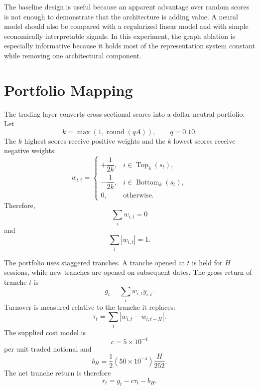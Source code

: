 \documentclass[10pt]{article}
\begin{document}
The baseline design is useful because an apparent advantage over random scores is not enough to demonstrate that the architecture is adding value. A neural model should also be compared with a regularized linear model and with simple economically interpretable signals. In this experiment, the graph ablation is especially informative because it holds most of the representation system constant while removing one architectural component.

\section{Portfolio Mapping}

The trading layer converts cross-sectional scores into a dollar-neutral portfolio. Let
\begin{equation}
k=\max(1,\operatorname{round}(qA)),
\qquad q=0.10.
\end{equation}
The $k$ highest scores receive positive weights and the $k$ lowest scores receive negative weights:
\begin{equation}
w_{i,t}
=
\begin{cases}
+\dfrac{1}{2k}, & i\in\operatorname{Top}_k(s_t),\\[5pt]
-\dfrac{1}{2k}, & i\in\operatorname{Bottom}_k(s_t),\\[5pt]
0, & \text{otherwise}.
\end{cases}
\end{equation}
Therefore,
\begin{equation}
\sum_iw_{i,t}=0
\end{equation}
and
\begin{equation}
\sum_i|w_{i,t}|=1.
\end{equation}

The portfolio uses staggered tranches. A tranche opened at $t$ is held for $H$ sessions, while new tranches are opened on subsequent dates. The gross return of tranche $t$ is
\begin{equation}
g_t=\sum_iw_{i,t}y_{i,t}.
\end{equation}
Turnover is measured relative to the tranche it replaces:
\begin{equation}
\tau_t=\sum_i|w_{i,t}-w_{i,t-H}|.
\end{equation}
The supplied cost model is
\begin{equation}
c=5\times10^{-4}
\end{equation}
per unit traded notional and
\begin{equation}
b_H=
\frac12
(50\times10^{-4})
\frac{H}{252}.
\end{equation}
The net tranche return is therefore
\begin{equation}
r_t=g_t-c\tau_t-b_H.
\end{equation}
\end{document}
